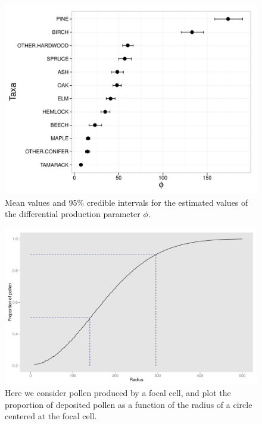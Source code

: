 \begin{figure}
\centering
\includegraphics[width=7in]{figures/phi.pdf}
\caption{Mean values and 95\% credible intervals for the estimated values of the differential production parameter $\phi$.}
\label{fig:phi}
\end{figure}

\begin{figure}
\centering
\includegraphics[width=7in]{figures/dispersal_vs_distance.pdf}
\caption{Here we consider pollen produced by a focal cell, and plot the proportion of deposited pollen as a function of the radius of a circle centered at the focal cell.}
\label{fig:dvd}
\end{figure}

